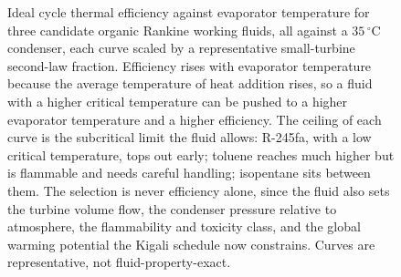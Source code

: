 \begin{figure}[htbp]
\centering
{}
\caption[Working-fluid selection for an organic Rankine cycle]{Ideal cycle
thermal efficiency against evaporator temperature for three candidate organic
Rankine working fluids, all against a $35\,^{\circ}$C condenser, each curve
scaled by a representative small-turbine second-law fraction. Efficiency rises
with evaporator temperature because the average temperature of heat addition
rises, so a fluid with a higher critical temperature can be pushed to a higher
evaporator temperature and a higher efficiency. The ceiling of each curve is the
subcritical limit the fluid allows: R-245fa, with a low critical temperature,
tops out early; toluene reaches much higher but is flammable and needs careful
handling; isopentane sits between them. The selection is never efficiency alone,
since the fluid also sets the turbine volume flow, the condenser pressure
relative to atmosphere, the flammability and toxicity class, and the global
warming potential the Kigali schedule now constrains. Curves are
representative, not fluid-property-exact.}
\label{fig:vol04ch03:orc-fluid-selection}
\end{figure}
